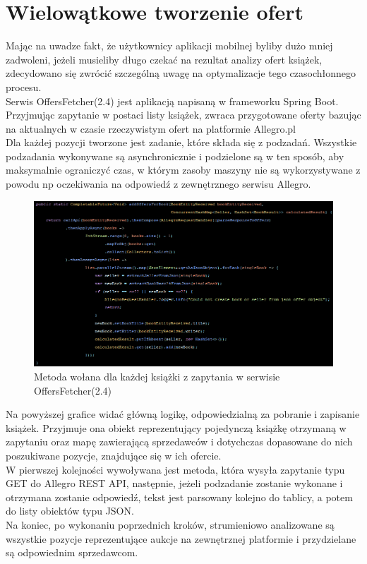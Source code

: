 
\section{Wielowątkowe tworzenie ofert}
Mając na uwadze fakt, że użytkownicy aplikacji mobilnej byliby dużo mniej zadwoleni, jeżeli musieliby długo czekać na rezultat analizy ofert książek, zdecydowano się zwrócić szczególną uwagę na optymalizacje tego czasochłonnego procesu.\\
Serwis OffersFetcher(2.4) jest aplikacją napisaną w frameworku Spring Boot. Przyjmując zapytanie w postaci listy książek, zwraca przygotowane oferty bazując na aktualnych w czasie rzeczywistym ofert na platformie Allegro.pl\\
Dla każdej pozycji tworzone jest zadanie, które składa się z podzadań. Wszystkie podzadania wykonywane są asynchronicznie i podzielone są w ten sposób, aby maksymalnie ograniczyć czas, w którym zasoby maszyny nie są wykorzystywane z powodu np oczekiwania na odpowiedź z zewnętrznego serwisu Allegro.
\begin{figure}[H]
	\centering
	\includegraphics[width=\linewidth]{tasks.png}
	\caption{Metoda wołana dla każdej książki z zapytania w serwisie OffersFetcher(2.4)}
\end{figure}
Na powyższej grafice widać główną logikę, odpowiedzialną za pobranie i zapisanie książek. Przyjmuje ona obiekt reprezentujący pojedynczą książkę otrzymaną w zapytaniu oraz mapę zawierającą sprzedawców i dotychczas dopasowane do nich poszukiwane pozycje, znajdujące się w ich ofercie.\\
W pierwszej kolejności wywoływana jest metoda, która wysyła zapytanie typu GET do Allegro REST API, następnie, jeżeli podzadanie zostanie wykonane i  otrzymana zostanie odpowiedź, tekst jest parsowany kolejno do tablicy, a potem do listy obiektów typu JSON.\\
Na koniec, po wykonaniu poprzednich kroków, strumieniowo analizowane są wszystkie pozycje reprezentujące aukcje na zewnętrznej platformie i przydzielane są odpowiednim sprzedawcom.


